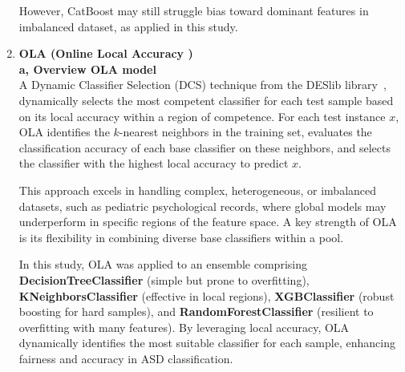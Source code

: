 \documentclass[conference]{IEEEtran}
\begin{document}
\begin{enumerate}
    
    However, CatBoost may still struggle bias toward dominant features in imbalanced dataset, as applied in this study.

    \item \textbf{OLA (Online Local Accuracy \cite{b16})} \\
    \textbf{a, Overview OLA model}\\
A Dynamic Classifier Selection (DCS) technique from the DESlib library~\cite{b17}, dynamically selects the most competent classifier for each test sample based on its local accuracy within a region of competence. For each test instance $x$, OLA identifies the $k$-nearest neighbors in the training set, evaluates the classification accuracy of each base classifier on these neighbors, and selects the classifier with the highest local accuracy to predict $x$.

This approach excels in handling complex, heterogeneous, or imbalanced datasets, such as pediatric psychological records, where global models may underperform in specific regions of the feature space. A key strength of OLA is its flexibility in combining diverse base classifiers within a pool. 

In this study, OLA was applied to an ensemble comprising \textbf{DecisionTreeClassifier} (simple but prone to overfitting), \textbf{KNeighborsClassifier} (effective in local regions), \textbf{XGBClassifier} (robust boosting for hard samples), and \textbf{RandomForestClassifier} (resilient to overfitting with many features). By leveraging local accuracy, OLA dynamically identifies the most suitable classifier for each sample, enhancing fairness and accuracy in ASD classification.


\end{enumerate}
\end{document}
